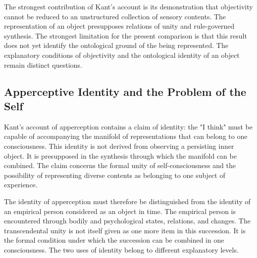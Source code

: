 The strongest contribution of Kant's account
is its demonstration that objectivity cannot
be reduced to an unstructured collection of
sensory contents. The representation of an
object presupposes relations of unity and
rule-governed synthesis. The strongest limitation
for the present comparison is that this result
does not yet identify the ontological ground
of the being represented. The explanatory
conditions of objectivity and the ontological
identity of an object remain distinct questions.



\subsection{Apperceptive Identity and the Problem of the Self}
\label{subsec:ch08-kant-self}

\label{para:VS.B01.P01.C08.S10.SS07.P001}

Kant's account of apperception contains a claim of
identity: the "I think" must be capable of accompanying
the manifold of representations that can belong
to one consciousness. This identity is not derived
from observing a persisting inner object. It is
presupposed in the synthesis through which the
manifold can be combined. The claim concerns
the formal unity of self-consciousness and the
possibility of representing diverse contents
as belonging to one subject of experience.
\cite[B131--B139]{KantCritiquePureReason}

\label{para:VS.B01.P01.C08.S10.SS07.P002}

The identity of apperception must therefore be
distinguished from the identity of an empirical
person considered as an object in time. The
empirical person is encountered through bodily
and psychological states, relations, and changes.
The transcendental unity is not itself given
as one more item in this succession. It is the
formal condition under which the succession
can be combined in one consciousness. The
two uses of identity belong to different
explanatory levels.

\label{para:VS.B01.P01.C08.S10.SS07.P003}

